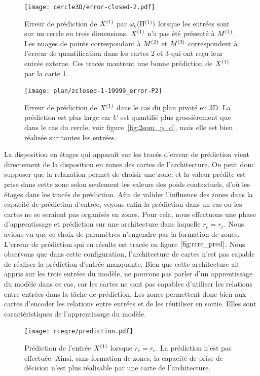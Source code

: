 \documentclass[../main]{subfiles}
\begin{document}
\begin{figure}
	\texttt{[image: cercle3D/error-closed-2.pdf]}
	\caption{Erreur de prédiction de $X^{({1})}$ par $\omega_e(\Pi^{({1})})$ lorsque les entrées sont sur un cercle en trois dimensions. $X^{({1})}$ n'a pas été présenté à $M^{({1})}$.
	 Les nuages de points correspondant à $M^{({2})}$ et $M^{({3})}$ correspondent à l'erreur de quantification dans les cartes 2 et 3 qui ont reçu leur entrée externe. Ces tracés montrent une bonne prédiction de $X^{({1})}$ par la carte 1. \label{fig:pred_cercle}}
\end{figure}

\begin{figure}
	\texttt{[image: plan/zclosed-1-19999\_error-P2]}	
	\caption{Erreur de prédiction de $X^{({1})}$ dans le cas du plan pivoté en 3D. La prédiction est plus large car $U$ est quantifié plus grossièrement que dans le cas du cercle, voir figure~\ref{fig:2som_p_d}, mais elle est bien réalisée sur toutes les entrées. \label{fig:plan3_pred}}
\end{figure}

La disposition en étages qui apparaît sur les tracés d'erreur de prédiction vient directement de la disposition en zones des cartes de l'architecture. 
On peut donc supposer que la relaxation permet de choisir une zone; et la valeur prédite est prise dans cette zone selon seulement les valeurs des poids contextuels, d'où les \og étages \fg{} dans les tracés de prédiction.
Afin de valider l'influence des zones dans la capacité de prédiction d'entrée, voyons enfin la prédiction dans un cas ou les cartes ne se seraient pas organisés en zones.
Pour cela, nous effectuons une phase d'apprentissage et prédiction sur une architecture dans laquelle $r_c = r_e$. 
Nous avions vu que ce choix de paramètres n'engendre pas la formation de zones. L'erreur de prédiction qui en résulte est tracée en figure $\ref{fig:rcre_pred}$.
Nous observons que dans cette configuration, l'architecture de cartes n'est pas capable de réaliser la prédiction d'entrée manquante.
Bien que cette architecture ait appris sur les trois entrées du modèle, ne pouvons pas parler d'un apprentissage du modèle dans ce cas, car les cartes ne sont pas capables d'utiliser les relations entre entrées dans la tâche de prédiction.
Les zones permettent donc bien aux cartes d'encoder les relations entre entrées et de les réutiliser en sortie. Elles sont caractéristiques de l'apprentissage du modèle.

\begin{figure}
	\centering\texttt{[image: rceqre/prediction.pdf]}
	\caption{Prédiction de l'entrée $X^{({1})}$ lorsque $r_c = r_e$. La prédiction n'est pas effectuée. Ainsi, sans formation de zones, la capacité de prise de décision n'est plus réalisable par une carte de l'architecture. \label{fig:rcre_pred}}
\end{figure}
\end{document}
